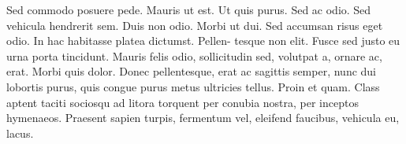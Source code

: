 \documentclass[ngerman]{uzhpub}
\begin{document}
Sed commodo posuere pede. Mauris ut est. Ut quis purus. Sed ac odio.
Sed vehicula hendrerit sem. Duis non odio. Morbi ut dui. Sed accumsan
risus eget odio. In hac habitasse platea dictumst. Pellen- tesque
non elit. Fusce sed justo eu urna porta tincidunt. Mauris felis odio,
sollicitudin sed, volutpat a, ornare ac, erat. Morbi quis dolor. Donec
pellentesque, erat ac sagittis semper, nunc dui lobortis purus, quis
congue purus metus ultricies tellus. Proin et quam. Class aptent taciti
sociosqu ad litora torquent per conubia nostra, per inceptos hymenaeos.
Praesent sapien turpis, fermentum vel, eleifend faucibus, vehicula
eu, lacus. 
\end{document}
